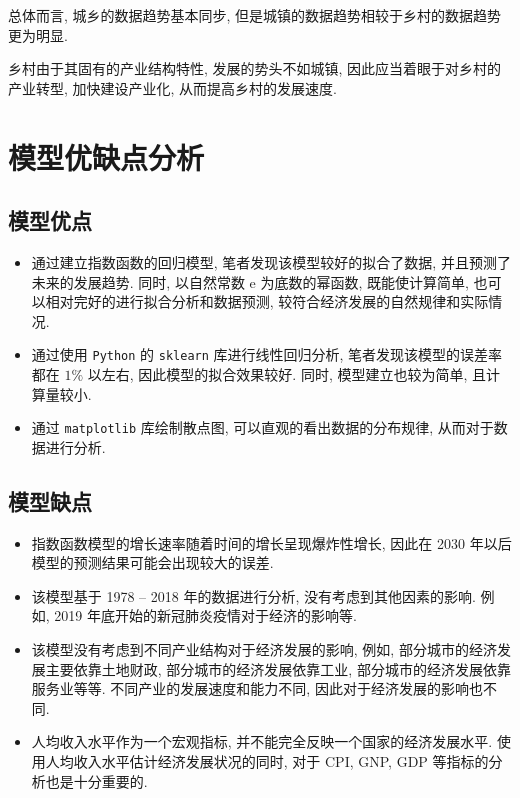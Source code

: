\documentclass{article}
\begin{document}
\par 总体而言, 城乡的数据趋势基本同步, 但是城镇的数据趋势相较于乡村的数据趋势更为明显.

\par 乡村由于其固有的产业结构特性, 发展的势头不如城镇, 因此应当着眼于对乡村的产业转型, 加快建设产业化, 从而提高乡村的发展速度.

\section{模型优缺点分析}\label{sec:advantage}

\subsection{模型优点}

\begin{itemize}
  \item 通过建立指数函数的回归模型, 笔者发现该模型较好的拟合了数据, 并且预测了未来的发展趋势. 同时, 以自然常数 $\mathrm e$ 为底数的幂函数, 既能使计算简单, 也可以相对完好的进行拟合分析和数据预测, 较符合经济发展的自然规律和实际情况.
  \item 通过使用 \texttt{Python} 的 \texttt{sklearn} 库进行线性回归分析, 笔者发现该模型的误差率都在 $1\%$ 以左右, 因此模型的拟合效果较好. 同时, 模型建立也较为简单, 且计算量较小.
  \item 通过 \texttt{matplotlib} 库绘制散点图, 可以直观的看出数据的分布规律, 从而对于数据进行分析.
\end{itemize}

\subsection{模型缺点}

\begin{itemize}
  \item 指数函数模型的增长速率随着时间的增长呈现爆炸性增长, 因此在 2030 年以后模型的预测结果可能会出现较大的误差.
  \item 该模型基于 1978 -- 2018 年的数据进行分析, 没有考虑到其他因素的影响. 例如, 2019 年底开始的新冠肺炎疫情对于经济的影响等.
  \item 该模型没有考虑到不同产业结构对于经济发展的影响, 例如, 部分城市的经济发展主要依靠土地财政, 部分城市的经济发展依靠工业, 部分城市的经济发展依靠服务业等等. 不同产业的发展速度和能力不同, 因此对于经济发展的影响也不同.
  \item 人均收入水平作为一个宏观指标, 并不能完全反映一个国家的经济发展水平. 使用人均收入水平估计经济发展状况的同时, 对于 CPI, GNP, GDP 等指标的分析也是十分重要的.
\end{itemize}
\end{document}
